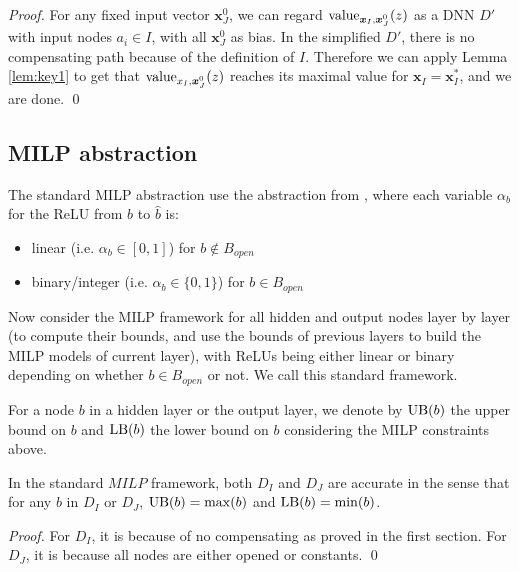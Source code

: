 			\begin{proof}
				
				
				For any fixed input vector $\boldsymbol{x}^0_J$, we can regard ${\textrm{value}}_{\boldsymbol{x}_I,\boldsymbol{x}^0_J}(z)$ as a DNN $D'$ with input nodes $a_i\in I$, with all $\boldsymbol{x}^0_J$ %
				as bias. In the simplified $D'$, there is no compensating path because of the definition of $I$. Therefore we can apply Lemma \ref{lem:key1} to get that ${\textrm{value}}_{x_I,\boldsymbol{x}^0_J}(z)$ reaches its maximal value for $\boldsymbol{x}_I=\boldsymbol{x}_I^*$, and we are done. \qed
			\end{proof}
			
			
			\subsection{MILP abstraction}
			
			The standard MILP abstraction use the abstraction from \cite{MILP}, 
			where each variable $\alpha_b$ for the ReLU from $b$ to $\hat{b}$ is:
			\begin{itemize}
				\item linear  (i.e. $\alpha_b \in [0,1]$) for $b \notin B_{open}$
				\item binary/integer (i.e. $\alpha_b \in \{0,1\}$) for $b \in B_{open}$
			\end{itemize}
			
			Now consider the MILP framework for all hidden and output nodes layer by layer (to compute their bounds, and use the bounds of previous layers to build the MILP models of current layer), with ReLUs being either linear or binary depending on whether $b \in B_{open}$ or not. We call this standard framework.
			
			For a node $b$ in a hidden layer or the output layer, we denote by $\mathrm{UB}(b)$ the upper bound on $b$ and $\mathrm{LB}(b)$ the lower bound on $b$ considering the MILP constraints above.
			
			
			\begin{lemma}
				In the standard $MILP$ framework, both $D_I$ and $D_J$ are accurate in the sense that for any $b$ in $D_I$ or $D_J$, $\mathrm{UB}(b)=\max(b)$ and $\mathrm{LB}(b)=\min(b)$.
			\end{lemma}
			
			\begin{proof}
				For $D_I$, it is because of no compensating as proved in the first section. For $D_J$, it is because all nodes are either opened or constants. \qed
			\end{proof}
			
